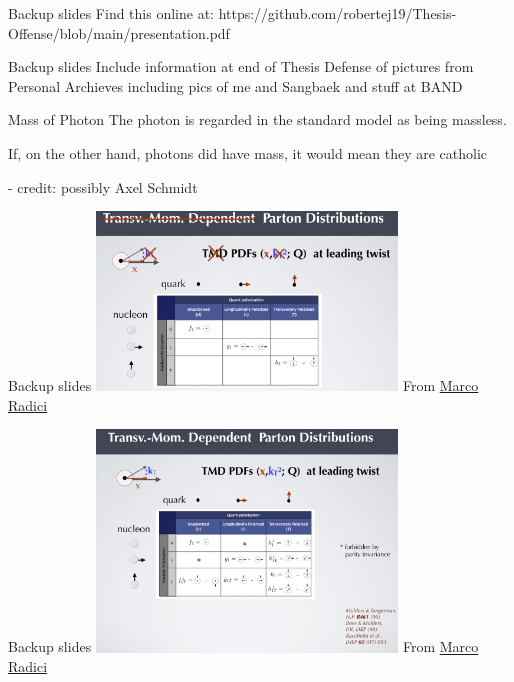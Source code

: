 \documentclass[aspectratio=169]{beamer}
\begin{document}
\begin{frame}{Backup slides}
\centering
    Find this online at: https://github.com/robertej19/Thesis-Offense/blob/main/presentation.pdf
\end{frame}

\begin{frame}{Backup slides}
\centering
    Include information at end of Thesis Defense of pictures from Personal Archieves including pics of me and Sangbaek and stuff at BAND
\end{frame}

\begin{frame}{Mass of Photon}
\centering
The photon is regarded in the standard model as being massless.

If, on the other hand, photons did have mass, it would mean they are catholic 

- credit: possibly Axel Schmidt
\end{frame}


\begin{frame}{Backup slides}
\centering
\includegraphics[width=0.6\textwidth]{backup/pdf_lead_twist.png}
From \href{https://indico.cern.ch/event/797767/contributions/3682622/attachments/1965784/3268756/6_radici.pdf}{Marco Radici}
\end{frame}




\begin{frame}{Backup slides}
\centering
\includegraphics[width=0.6\textwidth]{backup/tmd_lead_twist.png}
From \href{https://indico.cern.ch/event/797767/contributions/3682622/attachments/1965784/3268756/6_radici.pdf}{Marco Radici}
\end{frame}
\end{document}
